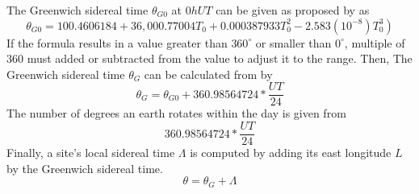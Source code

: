 The Greenwich sidereal time $\theta_{G 0}$ at $0 h U T$ can be given as proposed by \cite{seidelmann2006explanatory} as
\begin{equation}
    \left.\theta_{G 0}=100.4606184+36,000.77004 T_{0}+0.000387933 T_{0}^{2}-2.583\left(10^{-8}\right) T_{0}^{3}\right)
\end{equation}
If the formula results in a value greater than $360^{\circ}$ or smaller than $0^{\circ}$, multiple of 360 must added or subtracted from the value to adjust it to the range.
Then, The Greenwich sidereal time $\theta_{G}$ can be calculated from by
\begin{equation}
    \theta_{G}=\theta_{G 0}+360.98564724 * \frac{U T}{24}
\end{equation}
The number of degrees an earth rotates within the day is given from
\begin{equation}
360.98564724 * \frac{U T}{24}
\end{equation}
Finally, a site's local sidereal time $\Lambda$ is computed by adding its east longitude $L$ by the Greenwich sidereal time.
\begin{equation}
\theta=\theta_{G}+\Lambda
\end{equation}



\clearpage